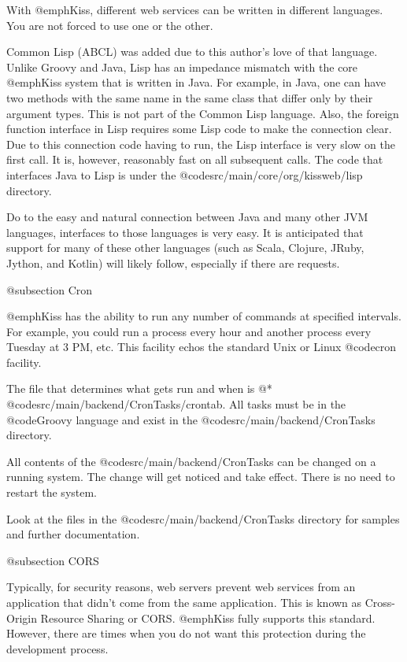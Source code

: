 With @emph{Kiss}, different web services can be written in different
languages.  You are not forced to use one or the other.

Common Lisp (ABCL) was added due to this author's love of that
language.  Unlike Groovy and Java, Lisp has an impedance mismatch with
the core @emph{Kiss} system that is written in Java.  For example, in
Java, one can have two methods with the same name in the same class
that differ only by their argument types.  This is not part of the
Common Lisp language.  Also, the foreign function interface in Lisp
requires some Lisp code to make the connection clear.  Due to this
connection code having to run, the Lisp interface is very slow on the
first call.  It is, however, reasonably fast on all subsequent calls.
The code that interfaces Java to Lisp is under the
@code{src/main/core/org/kissweb/lisp} directory.

Do to the easy and natural connection between Java and many other JVM
languages, interfaces to those languages is very easy.  It is
anticipated that support for many of these other languages (such as
Scala, Clojure, JRuby, Jython, and Kotlin) will likely follow,
especially if there are requests.

@subsection Cron

@emph{Kiss} has the ability to run any number of commands at specified
intervals.  For example, you could run a process every hour and
another process every Tuesday at 3 PM, etc.  This facility echos 
the standard Unix or Linux @code{cron} facility.

The file that determines what gets run and when is @*
@code{src/main/backend/CronTasks/crontab}.  All tasks must be in
the @code{Groovy} language and exist in the
@code{src/main/backend/CronTasks} directory.

All contents of the @code{src/main/backend/CronTasks} can be changed
on a running system.  The change will get noticed and take effect.
There is no need to restart the system.

Look at the files in the @code{src/main/backend/CronTasks}
directory for samples and further documentation.

@subsection CORS

Typically, for security reasons, web servers prevent web services from
an application that didn't come from the same application.  This is
known as Cross-Origin Resource Sharing or CORS.  @emph{Kiss} fully
supports this standard.  However, there are times when you do not want 
this protection during the development process.


